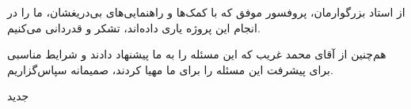 

\begin{center}
\end{center}

از استاد بزرگوارمان، پروفسور موفق که با کمک‌ها و راهنمایی‌های بی‌دریغشان، ما را در انجام این پروژه یاری داده‌اند، تشکر و قدردانی می‌کنیم.

هم‌چنین از آقای محمد غریب که این مسئله را به ما پیشنهاد دادند و شرایط مناسبی برای پیشرفت این مسئله را برای ما مهیا کردند، صمیمانه سپاس‌گزاریم.

‌جدید
